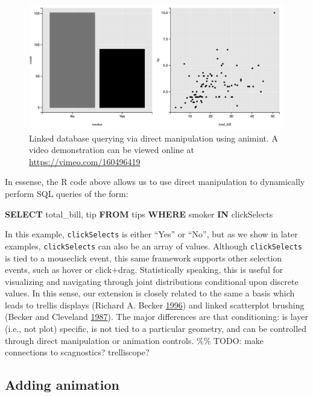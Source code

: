 \documentclass[12pt,]{isuthesis}
\newenvironment{Shaded}{\begin{snugshade}}{\end{snugshade}}
\newcommand{\KeywordTok}[1]{\textcolor[rgb]{0.13,0.29,0.53}{\textbf{{#1}}}}
\newcommand{\NormalTok}[1]{{#1}}
\begin{document}
\begin{figure}[htbp]
\centering
\includegraphics{images/tips}
\caption{\label{fig:tips}Linked database querying via direct manipulation
using animint. A video demonstration can be viewed online at
\url{https://vimeo.com/160496419}}
\end{figure}

In essense, the R code above allows us to use direct manipulation to
dynamically perform SQL queries of the form:

\begin{Shaded}
\begin{Highlighting}[]
\KeywordTok{SELECT} \NormalTok{total_bill, tip }\KeywordTok{FROM} \NormalTok{tips}
  \KeywordTok{WHERE} \NormalTok{smoker }\KeywordTok{IN} \NormalTok{clickSelects}
\end{Highlighting}
\end{Shaded}

In this example, \texttt{clickSelects} is either ``Yes'' or ``No'', but
as we show in later examples, \texttt{clickSelects} can also be an array
of values. Although \texttt{clickSelects} is tied to a mouseclick event,
this same framework supports other selection events, such as hover or
click+drag. Statistically speaking, this is useful for visualizing and
navigating through joint distributions conditional upon discrete values.
In this sense, our extension is closely related to the same a basis
which leads to trellis displays (Richard A. Becker
\protect\hyperlink{ref-trellis}{1996}) and linked scatterplot brushing
(Becker and Cleveland
\protect\hyperlink{ref-brushing-scatterplots}{1987}). The major
differences are that conditioning: is layer (i.e., not plot) specific,
is not tied to a particular geometry, and can be controlled through
direct manipulation or animation controls. \%\% TODO: make connections
to scagnostics? trelliscope?

\subsection{Adding animation}
\label{sec:animation}
\end{document}
